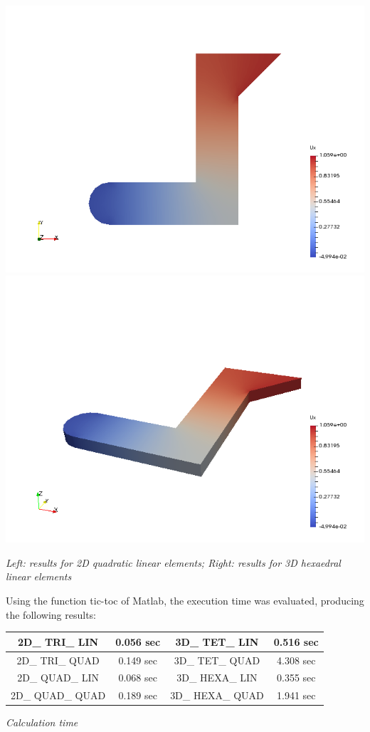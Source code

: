 \documentclass[paper=a4, fontsize=11pt]{article} %
\numberwithin{equation}{section} %
\numberwithin{figure}{section} %
\numberwithin{table}{section} %
\begin{document}
\begin{center}
\includegraphics[scale=0.3]{results_2d}\includegraphics[scale=0.3]{results_3d}


\textit{Left: results for 2D quadratic linear elements; Right: results for 3D hexaedral linear elements}
\end{center}

Using the function tic-toc of Matlab, the execution time was evaluated, producing the following results:
\begin{center}
\begin{tabular}{|c c|c c|}
\hline 
2D\_ TRI\_ LIN & 0.056 sec & 3D\_ TET\_ LIN & 0.516 sec \\ 
\hline 
2D\_ TRI\_ QUAD & 0.149 sec & 3D\_ TET\_ QUAD & 4.308 sec \\ 
\hline 
2D\_ QUAD\_ LIN & 0.068 sec & 3D\_ HEXA\_ LIN & 0.355 sec \\ 
\hline 
2D\_ QUAD\_ QUAD & 0.189 sec & 3D\_ HEXA\_ QUAD & 1.941 sec \\ 
\hline 
\end{tabular} 

\textit{Calculation time}
\end{center}
\end{document}

